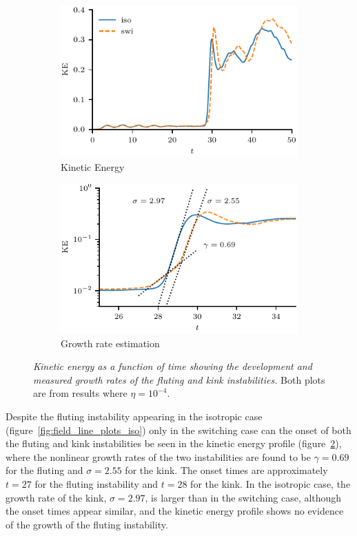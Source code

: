 \documentclass[12pt]{article}
\newcommand{\mycaption}[2]{\caption[#1]{\emph{#1} #2}}
\begin{document}
\begin{figure}[t]
  \centering
    \begin{subfigure}{0.49\textwidth}
      \includegraphics[width=\linewidth]{kinetic_energy-4.pdf}
      \caption{Kinetic Energy}
      \label{fig:kink_ke-4}
    \end{subfigure}
    \hfill
    \begin{subfigure}{0.49\textwidth}
      \includegraphics[width=\linewidth]{kinetic_energy_log-4.pdf}
      \caption{Growth rate estimation}
      \label{fig:kink_ke_log-4}
    \end{subfigure}
  \mycaption{Kinetic energy as a function of time showing the development and measured growth rates of the fluting and kink instabilities.}{Both plots are from results where $\eta=10^{-4}$.}
\label{fig:kink_str8_ke-4}%
\end{figure}

Despite the fluting instability appearing in the isotropic case (figure~\ref{fig:field_line_plots_iso}) only in the switching case can the onset of both the fluting and kink instabilities be seen in the kinetic energy profile (figure~\ref{fig:kink_ke_log-4}), where the nonlinear growth rates of the two instabilities are found to be $\gamma = 0.69$ for the fluting and $\sigma = 2.55$ for the kink. The onset times are approximately $t=27$ for the fluting instability and $t=28$ for the kink. In the isotropic case, the growth rate of the kink, $\sigma = 2.97$, is larger than in the switching case, although the onset times appear similar, and the kinetic energy profile shows no evidence of the growth of the fluting instability.
\end{document}
